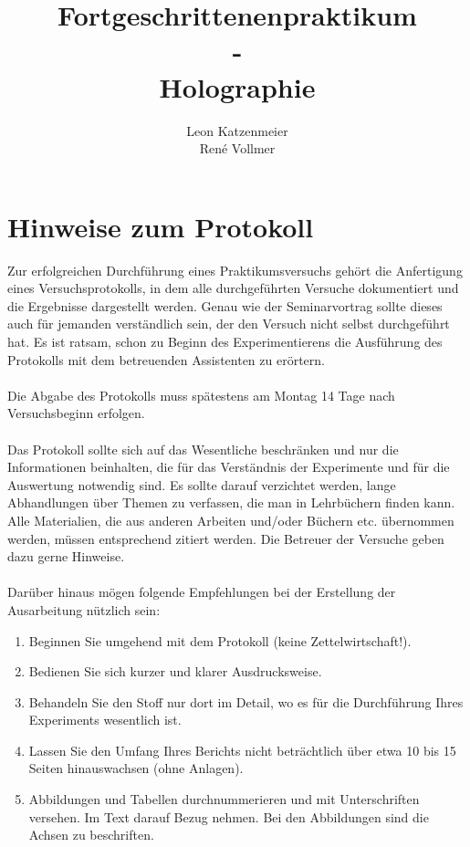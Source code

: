 \documentclass[10pt,a4paper]{article}
\begin{document}

\title{Fortgeschrittenenpraktikum\\ -\\ Holographie }
\author{Leon Katzenmeier \\ René Vollmer}

\maketitle
\newpage

\tableofcontents
\vfill
\newpage


\section{Hinweise zum Protokoll}

Zur erfolgreichen Durchführung eines Praktikumsversuchs gehört die Anfertigung eines Versuchsprotokolls, in dem alle durchgeführten Versuche dokumentiert und die Ergebnisse dargestellt werden. Genau wie der Seminarvortrag sollte dieses auch für jemanden verständlich sein, der den Versuch nicht selbst durchgeführt hat. Es ist ratsam, schon zu Beginn des Experimentierens die Ausführung des Protokolls mit dem betreuenden Assistenten zu erörtern.\\
\\
Die Abgabe des Protokolls muss spätestens am Montag 14 Tage nach Versuchsbeginn erfolgen.\\
\\
Das Protokoll sollte sich auf das Wesentliche beschränken und nur die Informationen beinhalten, die für das Verständnis der Experimente und für die Auswertung notwendig sind. Es sollte darauf verzichtet werden, lange Abhandlungen über Themen zu verfassen, die man in Lehrbüchern finden kann. Alle Materialien, die aus anderen Arbeiten und/oder Büchern etc. übernommen werden, müssen entsprechend zitiert werden. Die Betreuer der Versuche geben dazu gerne Hinweise.\\
\\
Darüber hinaus mögen folgende Empfehlungen bei der Erstellung der Ausarbeitung nützlich sein:\\
\begin{enumerate}
\item Beginnen Sie umgehend mit dem Protokoll (keine Zettelwirtschaft!).
\item Bedienen Sie sich kurzer und klarer Ausdrucksweise.
\item Behandeln Sie den Stoff nur dort im Detail, wo es für die Durchführung Ihres Experiments wesentlich ist.
\item Lassen Sie den Umfang Ihres Berichts nicht beträchtlich über etwa 10 bis 15 Seiten hinauswachsen (ohne Anlagen).
\item Abbildungen und Tabellen durchnummerieren und mit Unterschriften versehen. Im Text darauf Bezug nehmen. Bei den Abbildungen sind die Achsen zu beschriften. 
\end{enumerate}
\end{document}

